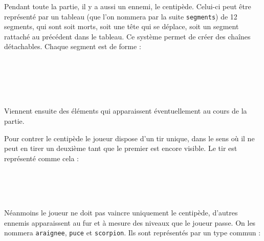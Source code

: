 Pendant toute la partie, il y a aussi un ennemi, le centipède. Celui-ci peut être représenté par un tableau (que l'on nommera par la suite \texttt{segments}) de 12 segments, qui sont soit morts, soit une tête qui se déplace, soit un segment rattaché au précédent dans le tableau. Ce système permet de créer des chaînes détachables. Chaque segment est de forme :

\begin{typeag}[Segment]
        \\
        \\
        \\
        \\
\end{typeag}

Viennent ensuite des éléments qui apparaissent éventuellement au cours de la partie.

Pour contrer le centipède le joueur dispose d'un tir unique, dans le sens où il ne peut en tirer un deuxième tant que le premier est encore visible.
Le tir est représenté comme cela : 

\begin{typeag}[Projectile]
        \\
        \\
        \\
\end{typeag}

Néanmoins le joueur ne doit pas vaincre uniquement le centipède, d'autres ennemis apparaissent au fur et à mesure des niveaux que le joueur passe. On les nommera \texttt{araignee}, \texttt{puce} et \texttt{scorpion}. Ils sont représentés par un type commun : 

